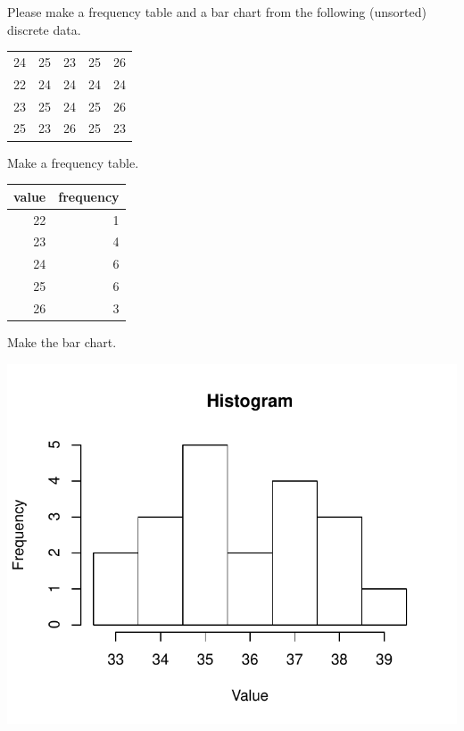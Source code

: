 
\begin{question}
Please make a frequency table and a bar chart from the following
(unsorted) discrete data.

\begin{longtable}[]{@{}rrrrr@{}}
\toprule
\endhead
24 & 25 & 23 & 25 & 26\tabularnewline
22 & 24 & 24 & 24 & 24\tabularnewline
23 & 25 & 24 & 25 & 26\tabularnewline
25 & 23 & 26 & 25 & 23\tabularnewline
\bottomrule
\end{longtable}
\end{question}

\begin{solution}
Make a frequency table.

\begin{longtable}[]{@{}rr@{}}
\toprule
value & frequency\tabularnewline
\midrule
\endhead
22 & 1\tabularnewline
23 & 4\tabularnewline
24 & 6\tabularnewline
25 & 6\tabularnewline
26 & 3\tabularnewline
\bottomrule
\end{longtable}

Make the bar chart.

\includegraphics{barchart-1.pdf}\\
\end{solution}

